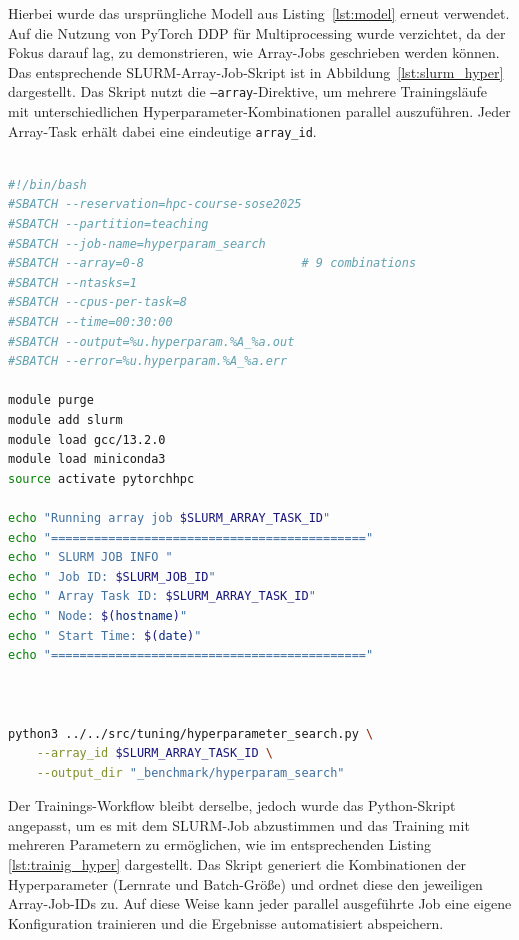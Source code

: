 \documentclass{article}
\begin{document}
Hierbei wurde das ursprüngliche Modell aus Listing~\ref{lst:model} erneut verwendet. 
Auf die Nutzung von PyTorch DDP für Multiprocessing wurde verzichtet, 
da der Fokus darauf lag, zu demonstrieren, wie Array-Jobs geschrieben werden können. 
Das entsprechende SLURM-Array-Job-Skript ist in Abbildung~\ref{lst:slurm_hyper} dargestellt.
Das Skript nutzt die \texttt{--array}-Direktive, um mehrere Trainingsläufe mit unterschiedlichen Hyperparameter-Kombinationen parallel auszuführen. 
Jeder Array-Task erhält dabei eine eindeutige \texttt{array\_id}.


\begin{lstlisting}[language=bash, caption={SLURM Array-Job zur Ausführung der Hyperparameter Suche}, label={lst:slurm_hyper}]

#!/bin/bash
#SBATCH --reservation=hpc-course-sose2025
#SBATCH --partition=teaching
#SBATCH --job-name=hyperparam_search
#SBATCH --array=0-8                      # 9 combinations
#SBATCH --ntasks=1
#SBATCH --cpus-per-task=8
#SBATCH --time=00:30:00
#SBATCH --output=%u.hyperparam.%A_%a.out
#SBATCH --error=%u.hyperparam.%A_%a.err

module purge
module add slurm
module load gcc/13.2.0
module load miniconda3
source activate pytorchhpc

echo "Running array job $SLURM_ARRAY_TASK_ID"
echo "============================================"
echo " SLURM JOB INFO "
echo " Job ID: $SLURM_JOB_ID"
echo " Array Task ID: $SLURM_ARRAY_TASK_ID"
echo " Node: $(hostname)"
echo " Start Time: $(date)"
echo "============================================"



python3 ../../src/tuning/hyperparameter_search.py \
    --array_id $SLURM_ARRAY_TASK_ID \
    --output_dir "_benchmark/hyperparam_search"
\end{lstlisting}
Der Trainings-Workflow bleibt derselbe, jedoch wurde das Python-Skript angepasst, 
um es mit dem SLURM-Job abzustimmen und das Training mit mehreren Parametern zu ermöglichen, 
wie im entsprechenden Listing \ref{lst:trainig_hyper} dargestellt.
Das Skript generiert die Kombinationen der Hyperparameter (Lernrate und Batch-Größe) 
und ordnet diese den jeweiligen Array-Job-IDs zu. 
Auf diese Weise kann jeder parallel ausgeführte Job eine eigene Konfiguration trainieren 
und die Ergebnisse automatisiert abspeichern.
\end{document}
